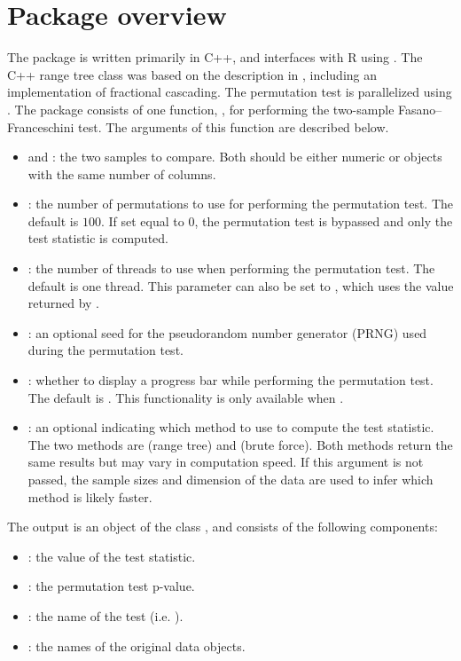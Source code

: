 
\section{Package overview}
The  package is written primarily in C++, and interfaces with R using  \citep{rcpp}. The C++ range tree class \citep{rtreeGithub} was based on the description in \citet{geometry_2008}, including an implementation of fractional cascading. The permutation test is parallelized using  \citep{rcppparallel}. The package consists of one function, , for performing the two-sample Fasano--Franceschini test. The arguments of this function are described below.
\begin{itemize}
\item {} and : the two samples to compare. Both should be either numeric  or  objects with the same number of columns.
\item {}: the number of permutations to use for performing the permutation test. The default is $100$. If set equal to $0$, the permutation test is bypassed and only the test statistic is computed.
\item {}: the number of threads to use when performing the permutation test. The default is one thread. This parameter can also be set to , which uses the value returned by .
\item {}: an optional seed for the pseudorandom number generator (PRNG) used during the permutation test.
\item {}: whether to display a progress bar while performing the permutation test. The default is . This functionality is only available when .
\item {}: an optional  indicating which method to use to compute the test statistic. The two methods are  (range tree) and  (brute force). Both methods return the same results but may vary in computation speed. If this argument is not passed, the sample sizes and dimension of the data are used to infer which method is likely faster.
\end{itemize}
The output is an object of the class , and consists of the following components:
\begin{itemize}
\item {}: the value of the test statistic.
\item {}: the permutation test p-value.
\item {}: the name of the test (i.e. ).
\item {}: the names of the original data objects.
\end{itemize}

